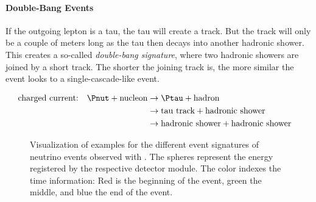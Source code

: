 \paragraph{Double-Bang Events}

If the outgoing lepton is a tau, the tau will create a track. But the
track will only be a couple of meters long as the tau then decays into
another hadronic shower. This creates a so-called
\textit{double-bang signature}, where two hadronic showers are joined by
a short track. The shorter the joining track is, the more similar the
event looks to a single-cascade-like event.
\cite{skysearch, energyreco, particledatareview}

\begin{align*}
  & \text{charged current:} & \Pnut + \text{nucleon}      & \rightarrow \Ptau + \text{hadron}                                   & \\
  &                         &                             & \rightarrow \text{tau track} + \text{hadronic shower}               & \\
  &                         &                             & \rightarrow \text{hadronic shower} + \text{hadronic shower}         & \\
\end{align*}

\begin{figure}[htbp]
  \centering
  \hfill
  \hfill
  \hfill
  \caption{Visualization of examples for the different event signatures of neutrino events observed with \icecube. The spheres represent the energy registered by the respective detector module. The color indexes the time information: Red is the beginning of the event, green the middle, and blue the end of the event.}
  \label{fig:eeQuaef6}
\end{figure}

